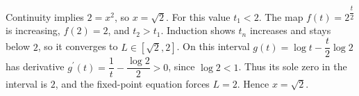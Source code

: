 Continuity implies $2=x^2$, so $x=\sqrt2$. For this value $t_1<2$. The map $f(t)=2^{\dfrac{t}{2}}$ is increasing, $f(2)=2$, and $t_2>t_1$. Induction shows $t_n$ increases and stays below $2$, so it converges to $L\in[\sqrt2,2]$. On this interval $g(t)=\log t-\dfrac{t}{2}\log2$ has derivative $g^{\prime}(t)=\dfrac{1}{t}-\dfrac{\log2}{2}>0$, since $\log2<1$. Thus its sole zero in the interval is $2$, and the fixed-point equation forces $L=2$. Hence $\boxed{x=\sqrt2}$.
